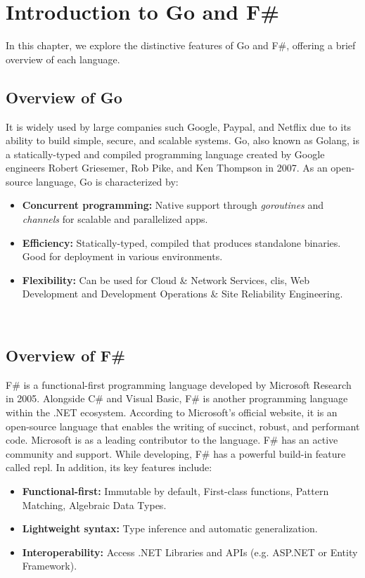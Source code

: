 
\chapter{Introduction to Go and F\#}\label{chap:introgoandfsharp}
In this chapter, we explore the distinctive features of Go and F\#, offering a brief overview of each language.

    \section{Overview of Go}\label{sec:go-overview}
    It is widely used by large companies such Google, Paypal, and Netflix due to its ability to build simple, secure, and scalable systems. Go, also known as Golang, is a statically-typed and compiled programming language created by Google engineers Robert Griesemer, Rob Pike, and Ken Thompson in 2007. As an open-source language, Go is characterized by: 
    \begin{itemize}
        \item \textbf{Concurrent programming:}  Native support through \textit{goroutines} and \textit{channels} for scalable and parallelized \ac{app}s.
        \item \textbf{Efficiency:} Statically-typed, compiled that produces standalone binaries. Good for deployment in various environments.
        \item \textbf{Flexibility:} Can be used for Cloud \& Network Services, \ac{cli}s, Web Development and Development Operations \& Site Reliability Engineering.
    \end{itemize}\ \cite{Gowebsite}

    \section{Overview of F\#}\label{sec:fsharp-overview}
    F\# is a functional-first programming language developed by Microsoft Research in 2005. Alongside C\# and Visual Basic, F\# is another programming language within the .NET ecosystem. According to Microsoft's official website, it is an open-source language that enables the writing of succinct, robust, and performant code. Microsoft is as a leading contributor to the language. F\# has an active community and support.\cite{Fsharpfoundation} While developing, F\# has a powerful build-in feature called \ac{repl}. In addition, its key features include:
    \begin{itemize}
        \item \textbf{Functional-first:} Immutable by default, First-class functions, Pattern Matching, Algebraic Data Types.
        \item \textbf{Lightweight syntax:} Type inference and automatic generalization.
        \item \textbf{Interoperability:} Access .NET Libraries and APIs (e.g. ASP.NET or Entity Framework).
    \end{itemize}\ \cite{Dotnet, Keyfeaturesfsharp}


